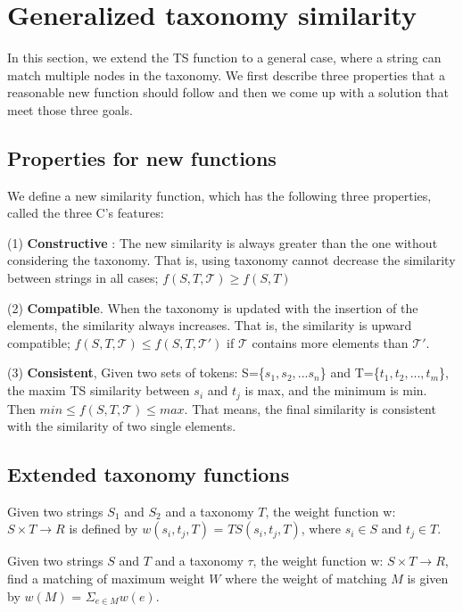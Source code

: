 
\section{Generalized taxonomy similarity}

In this section, we extend the TS function to a general case, where a string can match multiple nodes in the taxonomy. We first describe three properties that  a reasonable new function should follow and then we come up with a solution that meet those three goals.



\subsection{Properties for new functions}

We define a new similarity function, which has the following three properties, called the three C's features:

(1) \textbf{Constructive }:  The new similarity is always greater than the one without considering the taxonomy. That is, using taxonomy  cannot decrease the similarity between strings in all cases; $f(S,T,\mathcal{T} ) \geq  f(S,T) $

(2) \textbf{Compatible}. When the taxonomy is updated with the insertion of the elements, the similarity always increases. That is, the similarity is upward compatible; $f(S,T,\mathcal{T} ) \leq  f(S,T, \mathcal{T'}) $ if $\mathcal{T}$ contains more elements than $\mathcal{T'}$.

(3) \textbf{Consistent}, Given two sets of tokens: S=\{$s_1,s_2,...s_n$\} and T=\{$t_1,t_2,...,t_m$\}, the maxim TS similarity between $s_i$ and $t_j$ is max, and the minimum is min. Then $ min \leq f(S,T,\mathcal{T} ) \leq max $. That means, the final similarity is consistent with the similarity of two single elements.

\subsection{Extended taxonomy functions}


\begin{definition}  Given two strings $S_1$ and $S_2$ and a taxonomy $T$, the weight function w: $S \times T \rightarrow R$ is defined by $w(s_i, t_j,T)$ = $TS(s_i,t_j,T)$, where $s_i \in S$ and $t_j \in T$.
\end{definition}

\begin{definition}  Given two strings $S$ and $T$ and a taxonomy $\tau$, the weight function w: $S \times T \rightarrow R$, find a matching of maximum weight $W$ where the weight of matching $M$ is given by $w(M)$ = $\Sigma_{e \in M} w(e)$.
\end{definition}

